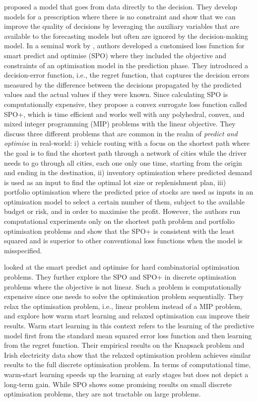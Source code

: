 \documentclass[graybox]{svmult}
\begin{document}
\citet{Bertsimas2020-li} proposed a model that goes from data directly to the decision. They develop models for a prescription where there is no constraint and show that we can improve the quality of decisions by leveraging the auxiliary variables that are available to the forecasting models but often are ignored by the decision-making model. In a seminal work by \citet{elmachtoub2022smart}, authors developed a customised loss function for smart predict and optimise (SPO)  where they included the objective and constraints of an optimisation model in the prediction phase. They introduced a decision-error function, i.e., the regret function,  that captures the decision errors measured by the difference between the decisions propagated by the predicted values and the actual values if they were known. Since calculating SPO is computationally expensive, they propose a convex surrogate loss function called SPO+, which is time efficient and works well with any polyhedral, convex, and mixed integer programming (MIP) problems with the linear objective. They discuss three different problems that are common in the realm of \textit{predict and optimise} in real-world: i) vehicle routing with a focus on the shortest path where the goal is to find the shortest path through a network of cities while the driver needs to go through all cities, each one only one time, starting from the origin and ending in the destination, ii) inventory optimisation where predicted demand is used as an input to find the optimal lot size or replenishment plan, iii) portfolio optimisation where the predicted price of stocks are used as inputs in an optimisation model to select a certain number of them, subject to the available budget or risk, and in order to maximise the profit. However, the authors run computational experiments only on the shortest path problem and portfolio optimisation problems and show that the SPO+ is consistent with the least squared and is superior to other conventional loss functions when the model is misspecified. 

\citet{mandi2020smart} looked at the smart predict and optimise for hard combinatorial optimisation problems. They further explore the SPO and SPO+ in discrete optimisation problems where the objective is not linear. Such a problem is computationally expensive since one needs to solve the optimisation problem sequentially. They relax the optimisation problem, i.e., linear problem instead of a MIP problem, and explore how warm start learning and relaxed optimisation can improve their results. Warm start learning in this context refers to the learning of the predictive model first from the standard mean squared error loss function and then learning from the regret function. Their empirical results on the Knapsack problem and Irish electricity data show that the relaxed optimisation problem achieves similar results to the full discrete optimisation problem. In terms of computational time, warm-start learning speeds up the learning at early stages but does not depict a long-term gain. While SPO shows some promising results on small discrete optimisation problems, they are not tractable on large problems. 
\end{document}
